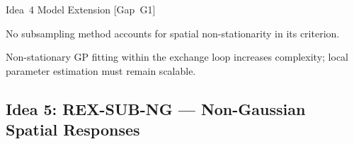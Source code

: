 \documentclass[12pt, a4paper]{article}
\newcommand{\novelty}[1]{\textbf{Novelty:} #1/5}
\newcommand{\feasibility}[1]{\textbf{Feasibility:} #1/5}
\begin{document}
\begin{ideabox}{Idea~4 \textbullet{} Model Extension [Gap~G1]}
\begin{description}[leftmargin=5em, labelwidth=4.5em]
  \item[\novelty{5}]
    No subsampling method accounts for spatial non-stationarity in its criterion.

  \item[\feasibility{3}]
    Non-stationary GP fitting within the exchange loop increases complexity; local
    parameter estimation must remain scalable.
\end{description}

\end{ideabox}

\subsection{Idea 5: REX-SUB-NG --- Non-Gaussian Spatial Responses}
\end{document}
